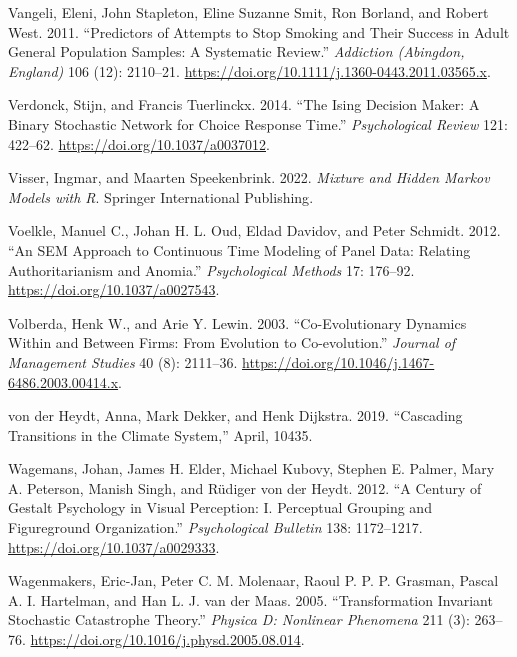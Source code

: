 \documentclass[
  a4paper,
  DIV=11,
  numbers=noendperiod,
  oneside]{scrreprt}
\newlength{\cslhangindent}
\newenvironment{CSLReferences}[2] %
 {\begin{list}{}{%
  \setlength{\itemindent}{0pt}
  \setlength{\leftmargin}{0pt}
  \setlength{\parsep}{0pt}
  \ifodd #1
   \setlength{\leftmargin}{\cslhangindent}
   \setlength{\itemindent}{-1\cslhangindent}
  \fi
  \setlength{\itemsep}{#2\baselineskip}}}
 {\end{list}}
\begin{document}
\begin{CSLReferences}{1}{0}
Vangeli, Eleni, John Stapleton, Eline Suzanne Smit, Ron Borland, and
Robert West. 2011. {``Predictors of Attempts to Stop Smoking and Their
Success in Adult General Population Samples: A Systematic Review.''}
\emph{Addiction (Abingdon, England)} 106 (12): 2110--21.
\url{https://doi.org/10.1111/j.1360-0443.2011.03565.x}.

Verdonck, Stijn, and Francis Tuerlinckx. 2014. {``The {Ising Decision
Maker}: {A} Binary Stochastic Network for Choice Response Time.''}
\emph{Psychological Review} 121: 422--62.
\url{https://doi.org/10.1037/a0037012}.

Visser, Ingmar, and Maarten Speekenbrink. 2022. \emph{Mixture and
{Hidden Markov Models} with {R}}. {Springer International Publishing}.

Voelkle, Manuel C., Johan H. L. Oud, Eldad Davidov, and Peter Schmidt.
2012. {``An {SEM} Approach to Continuous Time Modeling of Panel Data:
{Relating} Authoritarianism and Anomia.''} \emph{Psychological Methods}
17: 176--92. \url{https://doi.org/10.1037/a0027543}.

Volberda, Henk W., and Arie Y. Lewin. 2003. {``Co-Evolutionary {Dynamics
Within} and {Between Firms}: {From Evolution} to {Co-evolution}.''}
\emph{Journal of Management Studies} 40 (8): 2111--36.
\url{https://doi.org/10.1046/j.1467-6486.2003.00414.x}.

von der Heydt, Anna, Mark Dekker, and Henk Dijkstra. 2019. {``Cascading
Transitions in the Climate System,''} April, 10435.

Wagemans, Johan, James H. Elder, Michael Kubovy, Stephen E. Palmer, Mary
A. Peterson, Manish Singh, and Rüdiger von der Heydt. 2012. {``A Century
of {Gestalt} Psychology in Visual Perception: {I}. {Perceptual} Grouping
and Figure\textendash ground Organization.''} \emph{Psychological
Bulletin} 138: 1172--1217. \url{https://doi.org/10.1037/a0029333}.

Wagenmakers, Eric-Jan, Peter C. M. Molenaar, Raoul P. P. P. Grasman,
Pascal A. I. Hartelman, and Han L. J. van der Maas. 2005.
{``Transformation Invariant Stochastic Catastrophe Theory.''}
\emph{Physica D: Nonlinear Phenomena} 211 (3): 263--76.
\url{https://doi.org/10.1016/j.physd.2005.08.014}.


\end{CSLReferences}
\end{document}
